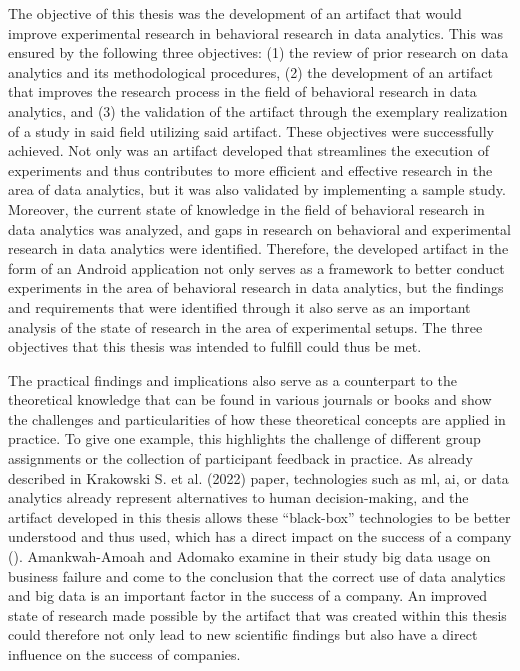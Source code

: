 The objective of this thesis was the development of an artifact that would improve experimental research in behavioral research in data analytics. This was ensured by the following three objectives: (1) the review of prior research on data analytics and its methodological procedures, (2) the development of an artifact that improves the research process in the field of behavioral research in data analytics, and (3) the validation of the artifact through the exemplary realization of a study in said field utilizing said artifact. These objectives were successfully achieved. Not only was an artifact developed that streamlines the execution of experiments and thus contributes to more efficient and effective research in the area of data analytics, but it was also validated by implementing a sample study. Moreover, the current state of knowledge in the field of behavioral research in data analytics was analyzed, and gaps in research on behavioral and experimental research in data analytics were identified. Therefore, the developed artifact in the form of an Android application not only serves as a framework to better conduct experiments in the area of behavioral research in data analytics, but the findings and requirements that were identified through it also serve as an important analysis of the state of research in the area of experimental setups. The three objectives that this thesis was intended to fulfill could thus be met.

The practical findings and implications also serve as a counterpart to the theoretical knowledge that can be found in various journals or books and show the challenges and particularities of how these theoretical concepts are applied in practice. To give one example, this highlights the challenge of different group assignments or the collection of participant feedback in practice. As already described in Krakowski S. et al. (2022) paper, technologies such as \ac{ml}, \ac{ai}, or data analytics already represent alternatives to human decision-making, and the artifact developed in this thesis allows these \enquote{black-box} technologies to be better understood and thus used, which has a direct impact on the success of a company (\cite{Krakowski.2023}). Amankwah-Amoah and Adomako examine in their study big data usage on business failure and come to the conclusion that the correct use of data analytics and big data is an important factor in the success of a company. An improved state of research made possible by the artifact that was created within this thesis could therefore not only lead to new scientific findings but also have a direct influence on the success of companies.

